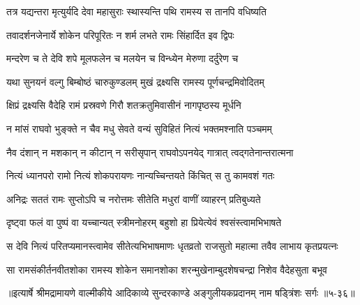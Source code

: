 \twolineshloka
{तत्र यद्यन्तरा मृत्युर्यदि देवा महासुराः}
{स्थास्यन्ति पथि रामस्य स तानपि वधिष्यति} %

\twolineshloka
{तवादर्शनजेनार्ये शोकेन परिपूरितः}
{न शर्म लभते रामः सिंहार्दित इव द्विपः} %

\twolineshloka
{मन्दरेण च ते देवि शपे मूलफलेन च}
{मलयेन च विन्ध्येन मेरुणा दर्दुरेण च} %

\twolineshloka
{यथा सुनयनं वल्गु बिम्बोष्ठं चारुकुण्डलम्}
{मुखं द्रक्ष्यसि रामस्य पूर्णचन्द्रमिवोदितम्} %

\twolineshloka
{क्षिप्रं द्रक्ष्यसि वैदेहि रामं प्रस्रवणे गिरौ}
{शतक्रतुमिवासीनं नागपृष्ठस्य मूर्धनि} %

\twolineshloka
{न मांसं राघवो भुङ्क्ते न चैव मधु सेवते}
{वन्यं सुविहितं नित्यं भक्तमश्नाति पञ्चमम्} %

\twolineshloka
{नैव दंशान् न मशकान् न कीटान् न सरीसृपान्}
{राघवोऽपनयेद् गात्रात् त्वद्गतेनान्तरात्मना} %

\twolineshloka
{नित्यं ध्यानपरो रामो नित्यं शोकपरायणः}
{नान्यच्चिन्तयते किंचित् स तु कामवशं गतः} %

\twolineshloka
{अनिद्रः सततं रामः सुप्तोऽपि च नरोत्तमः}
{सीतेति मधुरां वाणीं व्याहरन् प्रतिबुध्यते} %

\twolineshloka
{दृष्ट्वा फलं वा पुष्पं वा यच्चान्यत् स्त्रीमनोहरम्}
{बहुशो हा प्रियेत्येवं श्वसंस्त्वामभिभाषते} %

\twolineshloka
{स देवि नित्यं परितप्यमानस्त्वामेव सीतेत्यभिभाषमाणः}
{धृतव्रतो राजसुतो महात्मा तवैव लाभाय कृतप्रयत्नः} %

\twolineshloka
{सा रामसंकीर्तनवीतशोका रामस्य शोकेन समानशोका}
{शरन्मुखेनाम्बुदशेषचन्द्रा निशेव वैदेहसुता बभूव} %


॥इत्यार्षे श्रीमद्रामायणे वाल्मीकीये आदिकाव्ये सुन्दरकाण्डे अङ्गुलीयकप्रदानम् नाम षड्त्रिंशः सर्गः ॥५-३६॥
